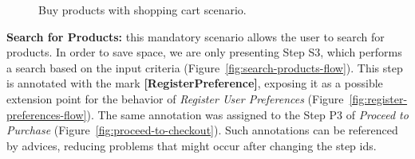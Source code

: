 \documentclass{acm_proc_article-sp}
\begin{document}
\begin{figure}[h]
\caption{Buy products with shopping cart scenario.}
\label{fig:buy-product-changing-flow}
\end{figure}

{\bf Search for Products:} this mandatory scenario allows the user to search for
products. In order to save space, we are only presenting Step S3, which performs
a search based on the input criteria (Figure~\ref{fig:search-products-flow}).
This step is annotated with the mark \mbox{{\bf [RegisterPreference]}}, exposing
it as a possible extension point for the behavior of \emph{Register User
Preferences} (Figure~\ref{fig:register-preferences-flow}). The same annotation
was assigned to the Step P3 of \emph{Proceed to Purchase}
(Figure~\ref{fig:proceed-to-checkout}). Such annotations can be referenced by advices, reducing problems
that might occur after changing the step ids.
\end{document}
